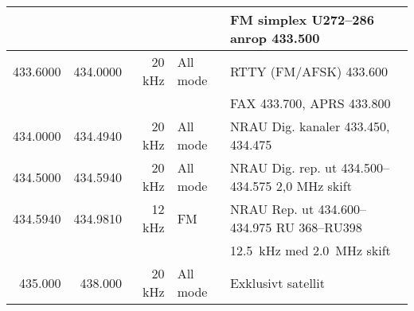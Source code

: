 \begin{tabular}{rrrll}
	                  &          &             &                 & FM simplex U272--286 \textbf{anrop \num{433,500}}                 \\ \hline
	         433.6000 & 434.0000 &      20 kHz & All mode        & RTTY (FM/AFSK) \num{433,600}                                      \\
	                  &          &             &                 & FAX \num{433,700}, APRS \num{433,800}                                   \\ \hline
	         434.0000 & 434.4940 &      20 kHz & All mode        & NRAU Dig. kanaler \num{433,450}, \num{434,475}                          \\ \hline
	         434.5000 & 434.5940 &      20 kHz & All mode        & NRAU Dig. rep. ut \numrange{434,500}{434,575} 2,0 MHz skift                 \\ \hline
	         434.5940 & 434.9810 &      12 kHz & FM              & NRAU Rep. ut \numrange{434,600}{434,975} RU 368--RU398                     \\
	                  &          &             &                 & \SI{12,5}{kHz} med \SI{2,0}{MHz} skift                                    \\ \hline
	          435.000 &  438.000 &      20 kHz & All mode        & Exklusivt satellit
\end{tabular}

